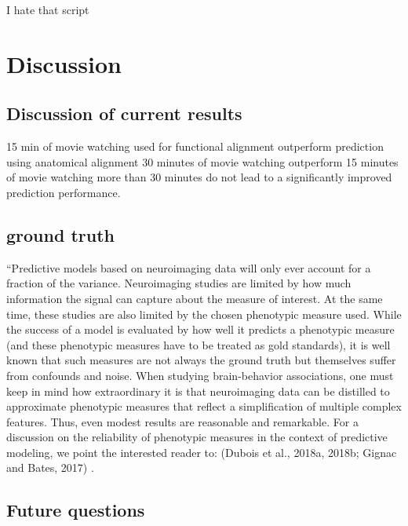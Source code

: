 I hate that script







\section{Discussion}


\subsection{Discussion of current results}
%
15 min of movie watching used for functional alignment outperform prediction
using anatomical alignment
%
30 minutes of movie watching outperform 15 minutes of movie watching
%
more than 30 minutes do not lead to a significantly improved prediction
performance.
%

\subsection{ground truth}

``Predictive models based on neuroimaging data will only ever account for a
fraction of the variance.
%
Neuroimaging studies are limited by how much information the signal can capture
about the measure of interest.
%
At the same time, these studies are also limited by the chosen phenotypic
measure used.  While the success of a model is evaluated by how well it predicts
a phenotypic measure (and these phenotypic measures have to be treated as gold
standards), it is well known that such measures are not always the ground truth
but themselves suffer from confounds and noise.
%
When studying brain-behavior associations, one must keep in mind how
extraordinary it is that neuroimaging data can be distilled to approximate
phenotypic measures that reﬂect a simpliﬁcation of multiple complex features.
%
Thus, even modest results are reasonable and remarkable.
%
For a discussion on the reliability of phenotypic measures in the context of
predictive modeling, we point the interested reader to: (Dubois et al., 2018a,
2018b; Gignac and Bates, 2017) \citep{scheinost2019ten}.

\subsection{Future questions}
%

